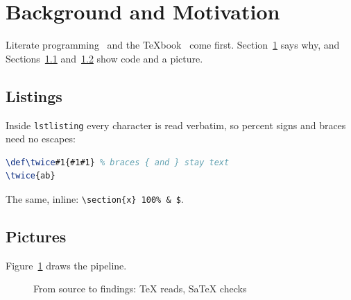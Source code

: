 \section[Background]{Background and Motivation}\label{sec:background}
Literate programming~\cite{knuth84} and the \TeX book~\cite{knuth86}
come first. Section~\ref{sec:background} says why, and
Sections~\ref{sec:listings} and~\ref{sec:pictures} show code and a picture.

\subsection{Listings}\label{sec:listings}
Inside \texttt{lstlisting} every character is read verbatim, so percent
signs and braces need no escapes:
\begin{lstlisting}[language=TeX]
\def\twice#1{#1#1} % braces { and } stay text
\twice{ab}
\end{lstlisting}
The same, inline: \lstinline|\section{x} 100% & $|.

\subsection{Pictures}\label{sec:pictures}
Figure~\ref{fig:flow} draws the pipeline.
\begin{figure}[ht]
  \centering
  \caption[The pipeline]{From source to findings: \TeX{} reads, SaTeX checks}\label{fig:flow}
\end{figure}

